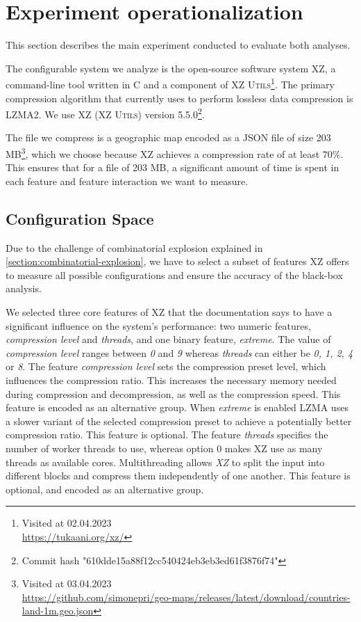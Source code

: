 \section{Experiment operationalization}\label{ch:Research-setup}
This section describes the main experiment conducted to evaluate both analyses.

The configurable system we analyze is the open-source software system \textsc{XZ}, a command-line tool written in \textsc{C} and a component of
\textsc{XZ Utils}\footnote{Visited at 02.04.2023\\ \url{https://tukaani.org/xz/}}.  
The primary compression algorithm that  currently uses to perform lossless data compression is LZMA2.
We use \textsc{XZ} \textsc{(XZ Utils)} version 5.5.0\footnote{Commit hash "610dde15a88f12cc540424eb3eb3ed61f3876f74"}.

The file we compress is a geographic map encoded as a \textsc{JSON} file of size 203 MB\footnote{Visited at 03.04.2023\\ \url{https://github.com/simonepri/geo-maps/releases/latest/download/countries-land-1m.geo.json}},
which we choose because \textsc{XZ} achieves a compression rate of at least $70\%$. 
This ensures that for a file of 203 MB, a significant amount of time is spent in each feature and feature interaction we want to measure.

\subsection{Configuration Space}
Due to the challenge of combinatorial explosion explained in \autoref{section:combinatorial-explosion}, 
we have to select a subset of features \textsc{XZ} offers to measure all possible configurations 
and ensure the accuracy of the black-box analysis. 

We selected three core features of \textsc{XZ} that the documentation says to have a significant influence on the system's performance: 
two numeric features, \emph{compression level} and \emph{threads}, and one binary feature, \emph{extreme}. 
The value of \emph{compression level} ranges between \emph{0} and \emph{9} whereas \emph{threads} can either be \emph{0, 1, 2, 4} or \emph{8}. 
The feature \emph{compression level} sets the compression preset level, which influences the compression ratio.
This increases the necessary memory needed during compression and decompression, as well as the compression speed. 
This feature is encoded as an alternative group.
When \emph{extreme} is enabled \textsc{LZMA} uses a slower variant of the selected compression preset to achieve a potentially better compression ratio.
This feature is optional.
The feature \emph{threads} specifies the number of worker threads to use, whereas option $0$ makes \textsc{XZ}  use as many threads as available cores.
Multithreading allows \emph{XZ} to split the input into different blocks and compress them independently of one another.
This feature is optional, and encoded as an alternative group.

